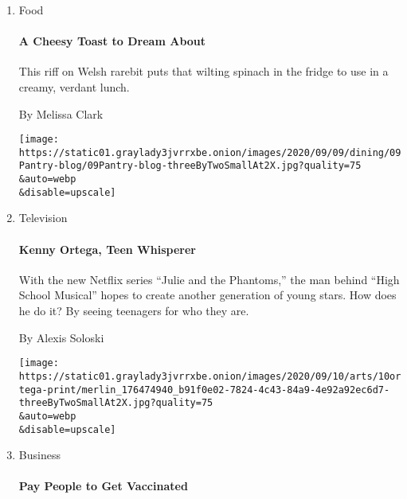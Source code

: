 \begin{enumerate}
\def\labelenumi{\arabic{enumi}.}
\item
  Food

  \href{/2020/09/09/dining/spinach-rarebit-recipe.html?searchResultPosition=1}{}

  \hypertarget{a-cheesy-toast-to-dream-about}{%
  \paragraph{A Cheesy Toast to Dream
  About}\label{a-cheesy-toast-to-dream-about}}

  This riff on Welsh rarebit puts that wilting spinach in the fridge to
  use in a creamy, verdant lunch.

  By Melissa Clark

  \texttt{[image: https://static01.graylady3jvrrxbe.onion/images/2020/09/09/dining/09Pantry-blog/09Pantry-blog-threeByTwoSmallAt2X.jpg?quality=75\\\&auto=webp\\\&disable=upscale]}
\item
  Television

  \href{/2020/09/09/arts/television/julie-phantoms-kenny-ortega-netflix.html?searchResultPosition=2}{}

  \hypertarget{kenny-ortega-teen-whisperer}{%
  \paragraph{Kenny Ortega, Teen
  Whisperer}\label{kenny-ortega-teen-whisperer}}

  With the new Netflix series ``Julie and the Phantoms,'' the man behind
  ``High School Musical'' hopes to create another generation of young
  stars. How does he do it? By seeing teenagers for who they are.

  By Alexis Soloski

  \texttt{[image: https://static01.graylady3jvrrxbe.onion/images/2020/09/10/arts/10ortega-print/merlin\_176474940\_b91f0e02-7824-4c43-84a9-4e92a92ec6d7-threeByTwoSmallAt2X.jpg?quality=75\\\&auto=webp\\\&disable=upscale]}
\item
  Business

  \href{/2020/09/09/business/pay-people-vaccine-coronavirus.html?searchResultPosition=3}{}

  \hypertarget{pay-people-to-get-vaccinated}{%
  \paragraph{Pay People to Get
  Vaccinated}\label{pay-people-to-get-vaccinated}}


\end{enumerate}
